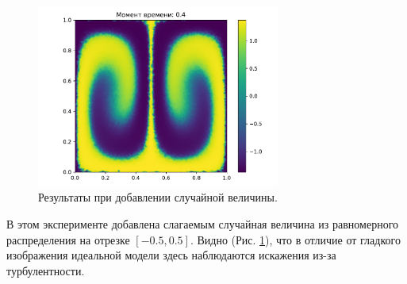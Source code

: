 \begin{figure}[H]
            \includegraphics[width=8cm]{pictures/pr20.pdf}
            \caption{Результаты при добавлении случайной величины.} \label{turb}
        \end{figure}

        В этом эксперименте добавлена слагаемым случайная величина из равномерного распределения на отрезке \( [-0.5, 0.5] \). 
        Видно (Рис. \ref{turb}), что в отличие от гладкого изображения идеальной модели здесь наблюдаются искажения из-за турбулентности.
